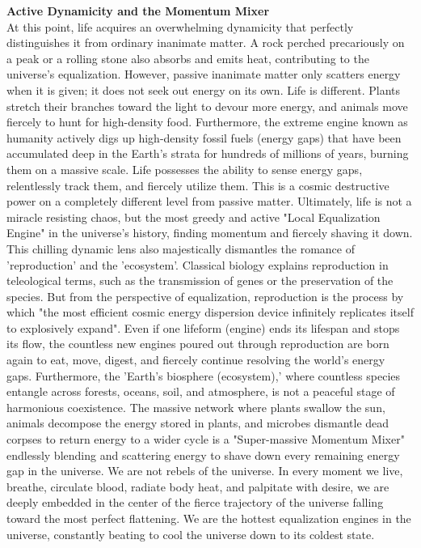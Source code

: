 \textbf{Active Dynamicity and the Momentum Mixer} \\
At this point, life acquires an overwhelming dynamicity that perfectly distinguishes it from ordinary inanimate matter. A rock perched precariously on a peak or a rolling stone also absorbs and emits heat, contributing to the universe's equalization. However, passive inanimate matter only scatters energy when it is given; it does not seek out energy on its own.
Life is different. Plants stretch their branches toward the light to devour more energy, and animals move fiercely to hunt for high-density food. Furthermore, the extreme engine known as humanity actively digs up high-density fossil fuels (energy gaps) that have been accumulated deep in the Earth's strata for hundreds of millions of years, burning them on a massive scale. Life possesses the ability to sense energy gaps, relentlessly track them, and fiercely utilize them. This is a cosmic destructive power on a completely different level from passive matter. Ultimately, life is not a miracle resisting chaos, but the most greedy and active "Local Equalization Engine" in the universe's history, finding momentum and fiercely shaving it down.
This chilling dynamic lens also majestically dismantles the romance of 'reproduction' and the 'ecosystem'. Classical biology explains reproduction in teleological terms, such as the transmission of genes or the preservation of the species. But from the perspective of equalization, reproduction is the process by which "the most efficient cosmic energy dispersion device infinitely replicates itself to explosively expand". Even if one lifeform (engine) ends its lifespan and stops its flow, the countless new engines poured out through reproduction are born again to eat, move, digest, and fiercely continue resolving the world's energy gaps.
Furthermore, the 'Earth's biosphere (ecosystem),' where countless species entangle across forests, oceans, soil, and atmosphere, is not a peaceful stage of harmonious coexistence. The massive network where plants swallow the sun, animals decompose the energy stored in plants, and microbes dismantle dead corpses to return energy to a wider cycle is a "Super-massive Momentum Mixer" endlessly blending and scattering energy to shave down every remaining energy gap in the universe.
We are not rebels of the universe. In every moment we live, breathe, circulate blood, radiate body heat, and palpitate with desire, we are deeply embedded in the center of the fierce trajectory of the universe falling toward the most perfect flattening. We are the hottest equalization engines in the universe, constantly beating to cool the universe down to its coldest state.
